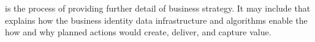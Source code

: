 \textbf{}
is the process of providing further detail of business strategy.
It may include  that explains how the business identity
data infrastructure and algorithms enable the how and why planned actions
would create, deliver, and capture value.
